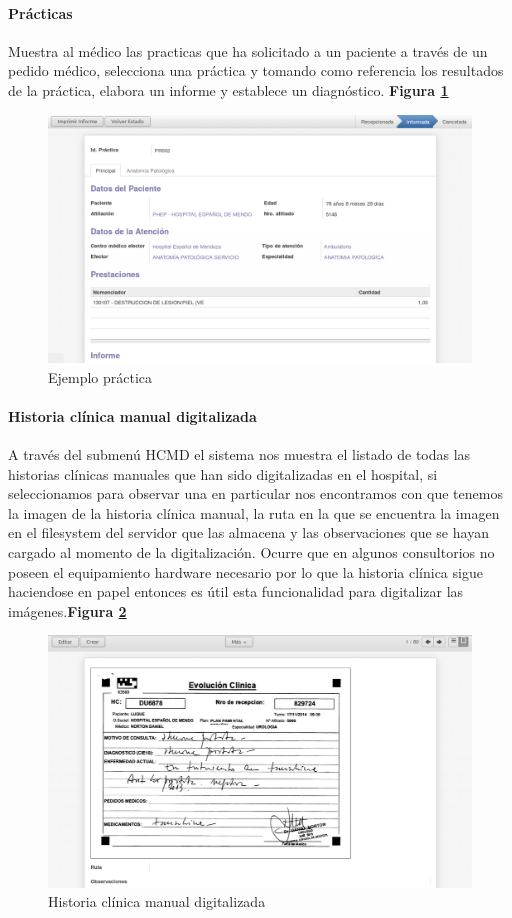 \paragraph{Prácticas}

Muestra al médico las practicas que ha solicitado a un paciente a través de un pedido médico, selecciona una práctica y tomando como referencia los resultados de la práctica, elabora un informe y establece un diagnóstico.
\textbf{Figura \ref{practica-medica}}

\begin{figure}
      \centering
      \includegraphics[width=.8\textwidth]{img/tp1/HE/Practica1}
      \caption{Ejemplo práctica}
      \label{practica-medica}
\end{figure}


\paragraph{Historia clínica manual digitalizada}

A través del submenú HCMD el sistema nos muestra el listado de todas las historias clínicas manuales que han sido digitalizadas en el hospital, si seleccionamos para observar una en particular nos encontramos con que tenemos la imagen de la historia clínica manual, la ruta en la que se encuentra la imagen en el filesystem del servidor que las almacena y las observaciones que se hayan cargado al momento de la digitalización.
Ocurre que en algunos consultorios no poseen el equipamiento hardware necesario por lo que la historia clínica sigue haciendose en papel entonces es útil esta funcionalidad para digitalizar las imágenes.\textbf{Figura \ref{HCMD}}

\begin{figure}[ht]
      \centering
      \includegraphics[width=.8\textwidth]{img/tp1/HE/HCMDmanualdigital}
      \caption{Historia clínica manual digitalizada}
      \label{HCMD}
\end{figure}


